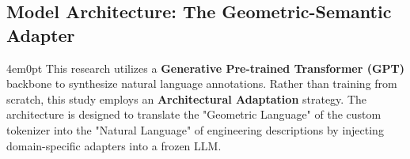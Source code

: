 	\subsection{Model Architecture: The Geometric-Semantic Adapter}
		\begin{indentedblock}{4em}{0pt}
			This research utilizes a \textbf{Generative Pre-trained Transformer (GPT)} backbone to synthesize natural language annotations. Rather than training from scratch, this study employs an \textbf{Architectural Adaptation} strategy. The architecture is designed to translate the "Geometric Language" of the custom tokenizer into the "Natural Language" of engineering descriptions by injecting domain-specific adapters into a frozen LLM.
		\end{indentedblock}
	
